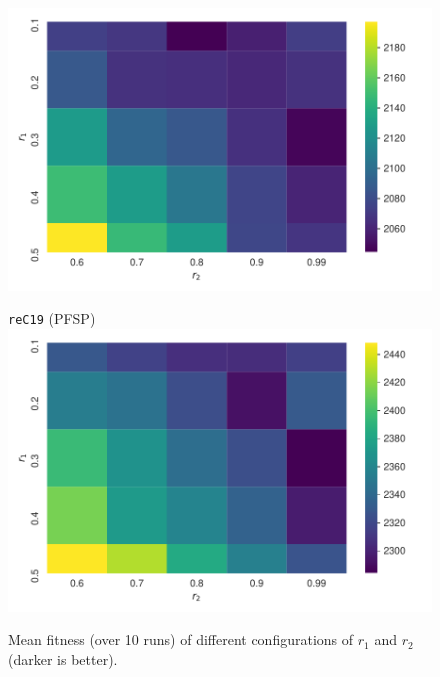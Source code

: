 \documentclass[sigconf,dvipsnames]{acmart}
\begin{document}
\begin{figure}[tb]
\begin{minipage}{0.49\linewidth}
  \includegraphics[width=\textwidth]{../img/heatmap_pfsp_rec13_txt}
\end{minipage}
\begin{minipage}{0.49\linewidth}
  \centering
  \texttt{reC19} (PFSP)\\[-0.5ex]
  \includegraphics[width=\textwidth]{../img/heatmap_pfsp_rec19_txt}
\end{minipage}
\caption{Mean fitness (over 10 runs) of different configurations of $r_1$ and $r_2$ (darker is better).\label{fig:heatmaps}}
\end{figure}
\end{document}

